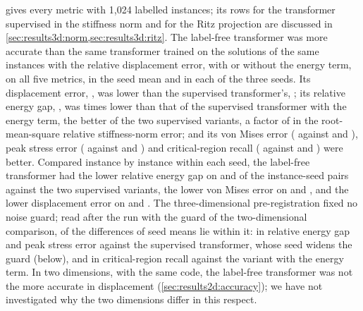  gives every metric with 1,024 labelled instances; its rows for the transformer
supervised in the stiffness norm and for the Ritz projection are discussed in
\cref{sec:results3d:norm,sec:results3d:ritz}. The label-free transformer was more accurate
than the same transformer trained on the solutions of the same instances with the relative
displacement error, with or without the energy term, on all five metrics, in the seed mean
and in each of the three seeds. Its displacement error, \numThreeFreeDisp{}, was
\numThreeFreeDispAdvantage{} lower than the supervised transformer's, \numThreeLabDisp{};
its relative energy gap, \numThreeFreeGap{}, was \numThreeAncOverFreeGap{} times lower than
that of the supervised transformer with the energy term, the better of the two supervised
variants, a factor of \numThreeAncOverFreeGapRoot{} in the root-mean-square relative
stiffness-norm error; and its von Mises error (\numThreeFreeVm{} against \numThreeLabVm{}
and \numThreeAncVm{}), peak stress error (\numThreeFreePeak{} against \numThreeLabPeak{} and
\numThreeAncPeak{}) and critical-region recall (\numThreeFreeRecall{} against
\numThreeLabRecall{} and \numThreeAncRecall{}) were better. Compared instance by instance
within each seed, the label-free transformer had the lower relative energy gap on
\numPairThreeLabGap{} and \numPairThreeAncGap{} of the \numThreePairs{} instance-seed pairs
against the two supervised variants, the lower von Mises error on \numPairThreeLabVm{} and
\numPairThreeAncVm{}, and the lower displacement error on \numPairThreeLabDisp{} and
\numPairThreeAncDisp{}. The three-dimensional pre-registration fixed no noise guard; read
after the run with the guard of the two-dimensional comparison, \numThreeGuardWithin{} of
the \numThreeGuardTotal{} differences of seed means lie within it: in relative energy gap
and peak stress error against the supervised transformer, whose seed \numThreeLabWorstSeed{}
widens the guard (below), and in critical-region recall against the variant with the energy
term. In two dimensions, with the same code, the label-free transformer was not the more
accurate in displacement (\cref{sec:results2d:accuracy}); we have not investigated why the
two dimensions differ in this respect.

